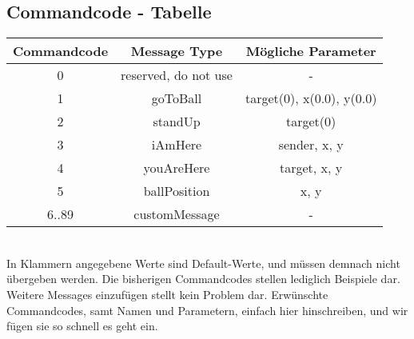 \subsection*{Commandcode - Tabelle}

\begin{tabular}{|c|c|c|}
\hline 
Commandcode & Message Type & Mögliche Parameter \\ 
\hline 
0 & reserved, do not use & - \\ 
\hline 
1 & goToBall & target(0), x(0.0), y(0.0) \\ 
\hline 
2 & standUp & target(0)\\ 
\hline 
3 & iAmHere & sender, x, y \\ 
\hline 
4 & youAreHere & target, x, y \\ 
\hline 
5 & ballPosition & x, y \\ 
\hline 
6..89 & customMessage & - \\ 
\hline 
\end{tabular}\\
In Klammern angegebene Werte sind Default-Werte, und müssen demnach nicht übergeben werden.
Die bisherigen Commandcodes stellen lediglich Beispiele dar. Weitere Messages einzufügen stellt kein Problem dar. 
Erwünschte Commandcodes, samt Namen und Parametern, einfach hier hinschreiben, und wir fügen sie so schnell es geht ein.